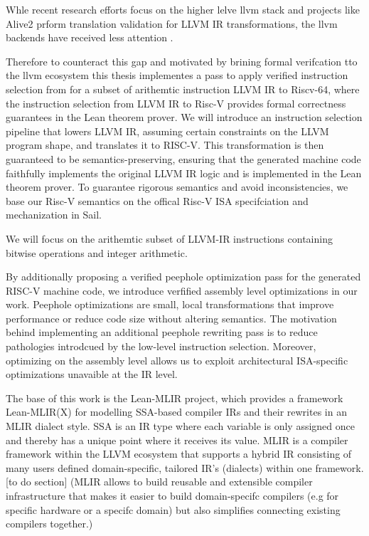 Whle recent research efforts focus on the higher lelve llvm stack and projects like Alive2 prform translation validation for LLVM IR transformations, the llvm backends have received less attention .

Therefore to counteract this gap and motivated by brining formal verifcation tto the llvm ecosystem this thesis implementes a pass to apply verified instruction selection from   for a subset of arithemtic instruction LLVM IR to Riscv-64, where the instruction selection from LLVM IR to Risc-V  provides formal correctness guarantees in the Lean theorem prover. We will introduce an instruction selection pipeline that lowers LLVM IR, assuming certain constraints on the LLVM program shape, and translates it to RISC-V. This transformation is then guaranteed to be semantics-preserving, ensuring that the generated machine code faithfully implements the original LLVM IR logic and is implemented in the Lean theorem prover. To guarantee rigorous semantics and avoid inconsistencies, we base our Risc-V semantics on the offical Risc-V ISA specifciation  and mechanization in Sail. 

We will focus on the arithemtic subset of LLVM-IR instructions containing bitwise operations and integer arithmetic.

By additionally proposing a verified peephole optimization pass for the generated RISC-V machine code, we introduce verfified assembly level optimizations in our work. Peephole optimizations are small, local transformations that improve performance or reduce code size without altering semantics. The motivation behind implementing an additional peephole rewriting pass is to reduce pathologies introdcued by the low-level instruction selection. Moreover, optimizing on the assembly level allows us to exploit architectural ISA-specific optimizations unavaible at the IR level.

The base of this work is the Lean-MLIR project, which provides a framework Lean-MLIR(X) for modelling SSA-based compiler IRs and their rewrites in an MLIR dialect style. SSA is an IR type where each variable is only assigned once and thereby has a unique point where it receives its value. MLIR is a compiler framework within the LLVM ecosystem that supports a hybrid IR consisting of many users defined domain-specific, tailored IR’s (dialects) within one framework.[to do section] (MLIR allows to build reusable and extensible compiler infrastructure that makes it easier to build domain-specifc compilers (e.g for specific hardware or a specifc domain) but also simplifies connecting existing compilers together.)


